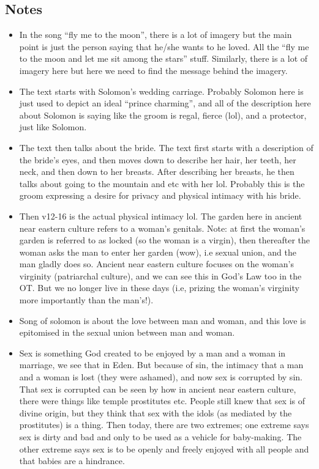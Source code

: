 \subsection*{Notes}
\begin{itemize}
  \item{In the song “fly me to the moon”, there is a lot of imagery but the main point is just the person saying that he/she wants to he loved. All the “fly me to the moon and let me sit among the stars” stuff. Similarly, there is a lot of imagery here but here we need to find the message behind the imagery.}
  \item{The text starts with Solomon’s wedding carriage. Probably Solomon here is just used to depict an ideal “prince charming”, and all of the description here about Solomon is saying like the groom is regal, fierce (lol), and a protector, just like Solomon. }
  \item{The text then talks about the bride. The text first starts with a description of the bride’s eyes, and then moves down to describe her hair, her teeth, her neck, and then down to her breasts. After describing her breasts, he then talks about going to the mountain and etc with her lol. Probably this is the groom expressing a desire for privacy and physical intimacy with his bride.}
  \item{Then v12-16 is the actual physical intimacy lol. The garden here in ancient near eastern culture refers to a woman’s genitals. Note: at first the woman’s garden is referred to as locked (so the woman is a virgin), then thereafter the woman asks the man to enter her garden (wow), i.e sexual union, and the man gladly does so. Ancient near eastern culture focuses on the woman’s virginity (patriarchal culture), and we can see this in God’s Law too in the OT. But we no longer live in these days (i.e, prizing the woman's virginity more importantly than the man's!).}
  \item{Song of solomon is about the love between man and woman, and this love is epitomised in the sexual union between man and woman. }
  \item{Sex is something God created to be enjoyed by a man and a woman in marriage, we see that in Eden. But because of sin, the intimacy that a man and a woman is lost (they were ashamed), and now sex is corrupted by sin. That sex is corrupted can be seen by how in ancient near eastern culture, there were things like temple prostitutes etc. People still knew that sex is of divine origin, but they think that sex with the idols (as mediated by the prostitutes) is a thing. Then today, there are two extremes; one extreme says sex is dirty and bad and only to be used as a vehicle for baby-making. The other extreme says sex is to be openly and freely enjoyed with all people and that babies are a hindrance.}

\end{itemize}
